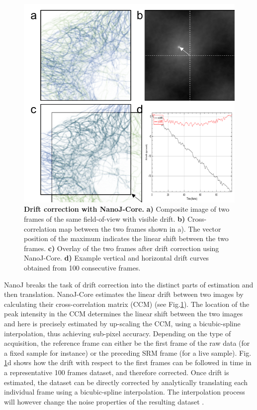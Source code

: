  \begin{figure}[!t]
    \centering
    \includegraphics[width=\linewidth]{Figures/Fig2_Drift_Initial.png}
    \caption{\textbf{Drift correction with NanoJ-Core.} \textbf{a)} Composite image of two frames of the same field-of-view with visible drift. \textbf{b)} Cross-correlation map between the two frames shown in a). The vector position of the maximum indicates the linear shift between the two frames. \textbf{c)} Overlay of the two frames after drift correction using NanoJ-Core. \textbf{d)} Example vertical and horizontal drift curves obtained from 100 consecutive frames.}
    \label{fig:DriftCorrection}
 \end{figure}

 NanoJ breaks the task of drift correction into the distinct parts of estimation and then translation. NanoJ-Core estimates the linear drift between two images by calculating their cross-correlation matrix (CCM) (see Fig.\ref{fig:DriftCorrection}). The location of the peak intensity in the CCM determines the linear shift between the two images and here is precisely estimated by up-scaling the CCM, using a bicubic-spline interpolation, thus achieving sub-pixel accuracy. Depending on the type of acquisition, the reference frame can either be the first frame of the raw data (for a fixed sample for instance) or the preceding SRM frame (for a live sample). Fig. \ref{fig:DriftCorrection}d shows how the drift with respect to the first frames can be followed in time in a representative 100 frames dataset, and therefore corrected. Once drift is estimated, the dataset can be directly corrected by analytically translating each individual frame using a bicubic-spline interpolation. The interpolation process will however change the noise properties of the resulting dataset \cite{blaysat2016effect}.
 
